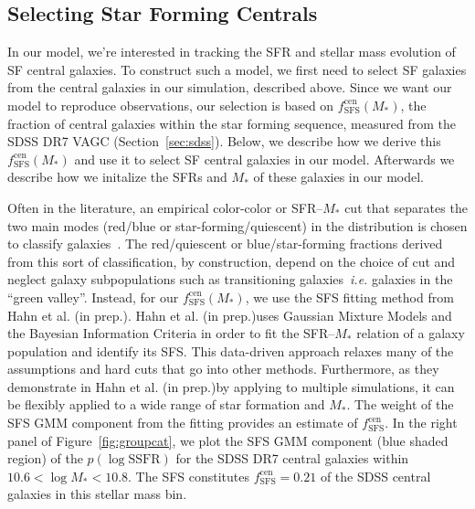 \documentclass[12pt, letterpaper, preprint, tighten]{aastex}
\newcommand{\hahngmm}{Hahn et al. (in prep.)}
\begin{document}
\subsection{Selecting Star Forming Centrals}  \label{sec:sfcen}
In our model, we're interested in tracking the SFR and stellar mass 
evolution of SF central galaxies. To construct such a model, we 
first need to select SF galaxies from the central galaxies in our 
simulation, described above. Since we want our model to reproduce 
observations, our selection is based on $f^\mathrm{cen}_\mathrm{SFS}(M_*)$, 
the fraction of central galaxies within the star forming sequence, 
measured from the SDSS DR7 VAGC (Section~\ref{sec:sdss}). Below, we 
describe how we derive this $f^\mathrm{cen}_\mathrm{SFS}(M_*)$ and use 
it to select SF central galaxies in our model. Afterwards we describe how 
we initalize the SFRs and $M_*$ of these galaxies in our model.

Often in the literature, an empirical color-color or SFR--$M_*$ cut 
that separates the two main modes (red/blue or star-forming/quiescent) 
in the distribution is chosen to classify 
galaxies~\citep[\emph{e.g.}][]{baldry2006, blanton2009, drory2009, peng2010, moustakas2013, hahn2015}.
The red/quiescent or blue/star-forming fractions derived from this sort 
of classification, by construction, depend on the choice of cut and 
neglect galaxy subpopulations such as transitioning galaxies~\emph{i.e.} 
galaxies in the ``green valley''. Instead, for our 
$f^\mathrm{cen}_\mathrm{SFS}(M_*)$, we use the SFS fitting method 
from \hahngmm. \hahngmm uses Gaussian Mixture Models and the Bayesian 
Information Criteria in order to fit the SFR--$M_*$ relation of a galaxy 
population and identify its SFS. This data-driven approach relaxes 
many of the assumptions and hard cuts that go into other methods. 
Furthermore, as they demonstrate in \hahngmm by applying to multiple 
simulations, it can be flexibly applied to a wide range of star 
formation and $M_*$. The weight of the SFS GMM component from the 
fitting provides an estimate of $f^\mathrm{cen}_\mathrm{SFS}$. 
In the right panel of Figure~\ref{fig:groupcat}, we plot the SFS 
GMM component (blue shaded region) of the $p(\log \mathrm{SSFR})$ 
for the SDSS DR7 central galaxies within $10.6 < \log M_* < 10.8$. 
The SFS constitutes $f^\mathrm{cen}_\mathrm{SFS} = 0.21$ of the 
SDSS central galaxies in this stellar mass bin. 
\end{document}
